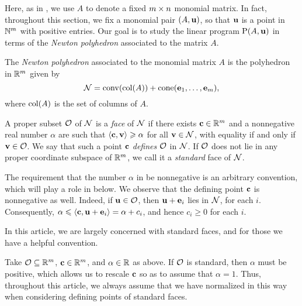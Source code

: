\documentclass[11pt]{amsart}
\begin{document}
Here, as in ,  we use $A$ to denote a fixed $m \times n$ monomial matrix.
In fact, throughout this section, we fix a monomial pair $(A, \mathbf{u})$, so that $\mathbf{u}$ is a point in $\mathbb{N}^m$ with positive entries.  Our goal is to study the linear program $\mathrm{P}(A, \mathbf{u})$ in terms of the \emph{Newton polyhedron} associated to the matrix $A$.

\begin{definition}
The \emph{Newton polyhedron} associated to the monomial matrix $A$ is the polyhedron in $\mathbb{R}^m$ given by
\[ \mathcal{N} = \operatorname{conv}( \operatorname{col}(A) ) + \operatorname{cone}( \mathbf{e}_1, \ldots, \mathbf{e}_m), \]
where $\operatorname{col}(A)$ is the set of columns of $A$.
\end{definition}

\begin{definition}
   \label{defn: face}
   A proper subset $\mathcal{O}$ of $\mathcal{N}$ is a \emph{face} of $\mathcal{N}$ if there exists $\mathbf{c} \in \mathbb{R}^m$ and a nonnegative real number $\alpha$ are such that $\langle \mathbf{c}, \mathbf{v} \rangle \geqslant \alpha$ for all $\mathbf{v} \in \mathcal{N}$, with equality if and only if $\mathbf{v} \in \mathcal{O}$.
   We say that such a point $\mathbf{c}$ \emph{defines} $\mathcal{O}$ in $\mathcal{N}$.
   If $\mathcal{O}$ does not lie in any proper coordinate subspace of $\mathbb{R}^m$, we call it a \emph{standard} face of $\mathcal{N}$.
\end{definition}

\begin{remark}
   \label{rmk: nonnegativity of defining point}
   The requirement that the number $\alpha$ in  be nonnegative is an arbitrary convention, which will play a role in  below.
   We observe that the defining point $\mathbf{c}$ is nonnegative as well.
   Indeed, if $\mathbf{u} \in \mathcal{O}$, then $\mathbf{u} + \mathbf{e}_i$ lies in $\mathcal{N}$, for each $i$.
   Consequently, $\alpha \leqslant \langle \mathbf{c}, \mathbf{u} + \mathbf{e}_i \rangle = \alpha + c_i$, and hence $c_i \ge 0$ for each $i$.
\end{remark}

In this article, we are largely concerned with standard faces, and for those we have a helpful convention.

\begin{convention}
\label{alpha=1: convention}
Take $\mathcal{O} \subseteq \mathbb{R}^m$, $\mathbf{c} \in \mathbb{R}^m$, and $\alpha \in \mathbb{R}$ as above.  If $\mathcal{O}$ is standard, then $\alpha$ must be positive, which allows us to rescale $\mathbf{c}$ so as to assume that $\alpha = 1$.   Thus, throughout this article, we always assume that we have normalized in this way when considering defining points of standard faces.
\end{convention}
\end{document}
